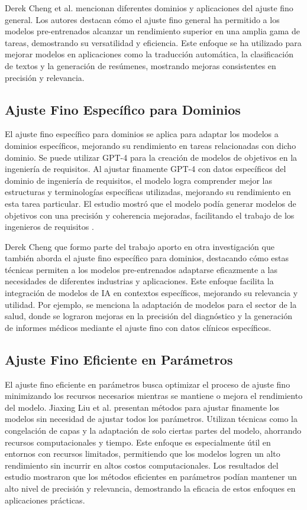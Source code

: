 Derek Cheng et al. \cite{Cheng2023} mencionan diferentes dominios y aplicaciones del ajuste fino general. Los autores destacan cómo el ajuste fino general ha permitido a los modelos pre-entrenados alcanzar un rendimiento superior en una amplia gama de tareas, demostrando su versatilidad y eficiencia. Este enfoque se ha utilizado para mejorar modelos en aplicaciones como la traducción automática, la clasificación de textos y la generación de resúmenes, mostrando mejoras consistentes en precisión y relevancia.

\subsection{Ajuste Fino Específico para Dominios}

El ajuste fino específico para dominios se aplica para adaptar los modelos a dominios específicos, mejorando su rendimiento en tareas relacionadas con dicho dominio. Se puede utilizar GPT-4 para la creación de modelos de objetivos en la ingeniería de requisitos. Al ajustar finamente GPT-4 con datos específicos del dominio de ingeniería de requisitos, el modelo logra comprender mejor las estructuras y terminologías específicas utilizadas, mejorando su rendimiento en esta tarea particular. El estudio mostró que el modelo podía generar modelos de objetivos con una precisión y coherencia mejoradas, facilitando el trabajo de los ingenieros de requisitos \cite{Chen2023}.

Derek Cheng que formo parte del trabajo \cite{Chen2023} aporto en otra investigación \cite{Cheng2023} que también aborda el ajuste fino específico para dominios, destacando cómo estas técnicas permiten a los modelos pre-entrenados adaptarse eficazmente a las necesidades de diferentes industrias y aplicaciones. Este enfoque facilita la integración de modelos de IA en contextos específicos, mejorando su relevancia y utilidad. Por ejemplo, se menciona la adaptación de modelos para el sector de la salud, donde se lograron mejoras en la precisión del diagnóstico y la generación de informes médicos mediante el ajuste fino con datos clínicos específicos.

\subsection{Ajuste Fino Eficiente en Parámetros}

El ajuste fino eficiente en parámetros busca optimizar el proceso de ajuste fino minimizando los recursos necesarios mientras se mantiene o mejora el rendimiento del modelo. Jiaxing Liu et al. \cite{Liu2023} presentan métodos para ajustar finamente los modelos sin necesidad de ajustar todos los parámetros. Utilizan técnicas como la congelación de capas y la adaptación de solo ciertas partes del modelo, ahorrando recursos computacionales y tiempo. Este enfoque es especialmente útil en entornos con recursos limitados, permitiendo que los modelos logren un alto rendimiento sin incurrir en altos costos computacionales. Los resultados del estudio mostraron que los métodos eficientes en parámetros podían mantener un alto nivel de precisión y relevancia, demostrando la eficacia de estos enfoques en aplicaciones prácticas.

